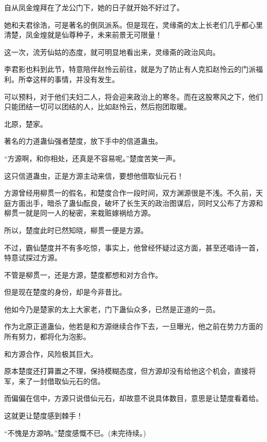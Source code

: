 \begin{this_body}
自从凤金煌拜在了龙公门下，她的日子就开始不好过了。

她和夫君徐浩，可是著名的倒凤派系。但是现在，灵缘斋的太上长老们几乎都心里清楚，凤金煌就是仙尊种子，未来前景无可限量！

这一次，流芳仙姑的态度，就可明显地看出来，灵缘斋的政治风向。

李君影也料到此节，特意陪伴赵怜云前往，就是为了防止有人克扣赵怜云的门派福利。所幸这样的事情，并没有发生。

可以预料，对于他们夫妇二人，将会迎来政治上的寒冬。而在这股寒风之下，他们只能团结一切可以团结的人，比如赵怜云，然后抱团取暖。

北原，楚家。

著名的力道蛊仙强者楚度，放下手中的信道蛊虫。

“方源啊，和你相处，还真是不容易呢。”楚度苦笑一声。

这只信道蛊虫，正是方源主动来信，要想他借取仙元石！

方源曾经用柳贯一的假名，和楚度合作一段时间，双方渊源很是不浅。不久前，天庭方面出手，暗杀了蛊仙酝良，破坏了长生天的政治图谋后，同时又公布了方源和柳贯一就是同一人的秘密，来栽赃嫁祸给方源。

所以，楚度此时已然知晓，柳贯一便是方源。

不过，霸仙楚度并不有多吃惊，事实上，他曾经怀疑过这方面，甚至还唱诗一首，特意试探过方源。

不管是柳贯一，还是方源，楚度都想和对方合作。

但是现在楚度的身份，却是今非昔比。

他如今乃是楚家的太上大家老，门下蛊仙众多，已然是正道的一员。

作为北原正道蛊仙，他若是和方源继续合作下去，一旦曝光，他之前在势力方面的所有努力，都将化为泡影。

和方源合作，风险极其巨大。

原本楚度还打算置之不理，保持模糊态度，但方源却没有给他这个机会，直接将军，来了一封借取仙元石的信。

而偏偏在信中，方源只说借仙元石，却故意不说具体数目，意思是让楚度看着给。

这就更让楚度感到棘手！

“不愧是方源呐。”楚度感慨不已。(未完待续。)

\end{this_body}


